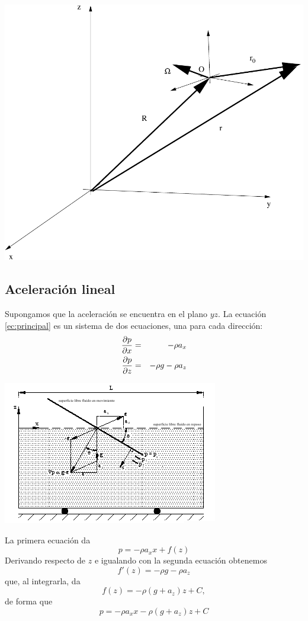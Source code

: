 \begin{center}
	\includegraphics[width=0.7\linewidth]{TeX_files/chapter02-Hidrostatica/sistema}
\end{center}


\subsection{Aceleración lineal}

Supongamos que la aceleración se encuentra en el plano $yz$. La ecuación \ref{ec:principal} es un sistema de dos ecuaciones, una para cada dirección:
\begin{eqnarray}
	\frac{\partial p}{\partial x} &=& -\rho a_x \\
	\frac{\partial p}{\partial z} &=& -\rho g - \rho a_z
\end{eqnarray} 

\begin{center}
	\includegraphics[width=0.7\columnwidth]{TeX_files/chapter02-Hidrostatica/ac_lineal1}
\end{center}

La primera ecuación da
\begin{equation}
	p = -\rho a_x x + f(z)
\end{equation} 
Derivando respecto de $z$ e igualando con la segunda ecuación obtenemos
\begin{equation}
	f'(z) = -\rho g - \rho a_z
\end{equation}
que, al integrarla, da
\begin{equation}
	f(z) = -\rho(g+a_z)z + C,
\end{equation}  
de forma que 
\begin{equation}
	\boxed{ p = -\rho a_x x -\rho(g+a_z)z + C}
\end{equation} 


